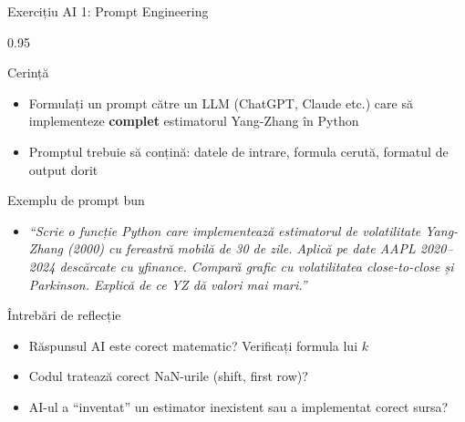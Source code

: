 \documentclass[9pt, aspectratio=169, t]{beamer}
\begin{document}
\begin{frame}[shrink=10]{Exercițiu AI 1: Prompt Engineering}
    \begin{cminipage}{0.95\textwidth}
    \begin{block}{Cerință}
    \begin{itemize}\setlength{\itemsep}{0pt}
        \item Formulați un prompt către un LLM (ChatGPT, Claude etc.) care să implementeze \textbf{complet} estimatorul Yang-Zhang în Python
        \item Promptul trebuie să conțină: datele de intrare, formula cerută, formatul de output dorit
    \end{itemize}
    \end{block}
    \vspace{0.1cm}
    \begin{exampleblock}{Exemplu de prompt bun}
    \begin{itemize}\setlength{\itemsep}{0pt}
        \item \textit{``Scrie o funcție Python care implementează estimatorul de volatilitate Yang-Zhang (2000) cu fereastră mobilă de 30 de zile. Aplică pe date AAPL 2020--2024 descărcate cu yfinance. Compară grafic cu volatilitatea close-to-close și Parkinson. Explică de ce YZ dă valori mai mari.''}
    \end{itemize}
    \end{exampleblock}
    \vspace{0.1cm}
    \begin{alertblock}{Întrebări de reflecție}
    \begin{itemize}\setlength{\itemsep}{0pt}
        \item Răspunsul AI este corect matematic? Verificați formula lui $k$
        \item Codul tratează corect NaN-urile (shift, first row)?
        \item AI-ul a ``inventat'' un estimator inexistent sau a implementat corect sursa?
    \end{itemize}
    \end{alertblock}
    \end{cminipage}
\end{frame}
\end{document}
